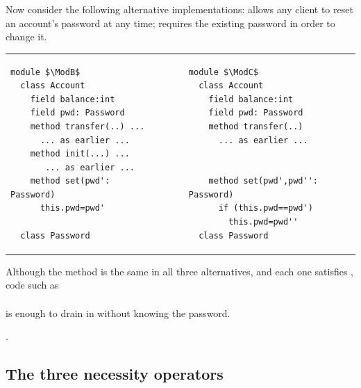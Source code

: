  
Now consider the following alternative implementations:
\ModB allows any client to reset an account's password at any time;
\ModC requires the existing password in order to change it.
  
  

\begin{tabular}{lll}
\begin{minipage}[b]{0.42\textwidth}
\begin{lstlisting}[mathescape=true, language=chainmail, frame=lines]
module $\ModB$
  class Account
    field balance:int 
    field pwd: Password 
    method transfer(..) ...
      ... as earlier ...
    method init(...) ...
       ... as earlier ...
    method set(pwd': Password)
      this.pwd=pwd'
      
  class Password
\end{lstlisting}
\end{minipage}
&\ \ \  \ \   &%
\begin{minipage}[b]{0.45\textwidth}
\begin{lstlisting}[mathescape=true, language=chainmail, frame=lines]
module $\ModC$
  class Account
    field balance:int 
    field pwd: Password 
    method transfer(..) 
      ... as earlier ...
    

    method set(pwd',pwd'': Password)
      if (this.pwd==pwd') 
        this.pwd=pwd''
  class Password
\end{lstlisting}
\end{minipage} 
\end{tabular}

Although the  method is the same in
all three alternatives, and each one satisfies \Sclassic,
code  {such as}
\\ 
$\ \strut \hspace{.2in} $ 
\\ 
is enough to drain   in \ModB without knowing the password.

.

\subsection{The three necessity operators}
\label{s:approach:necopers}

